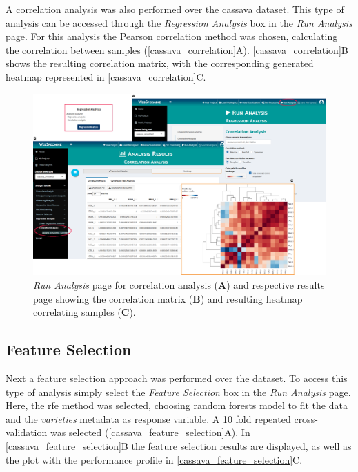 A correlation analysis was also performed over the cassava dataset. This type of analysis can be accessed through the \textit{Regression Analysis} box in the \textit{Run Analysis} page. For this analysis the Pearson correlation method was chosen, calculating the correlation between samples (\autoref{cassava_correlation}A). \autoref{cassava_correlation}B shows the resulting correlation matrix, with the corresponding generated heatmap represented in \autoref{cassava_correlation}C.


\begin{figure}[H]
	\centering
	\includegraphics[width=1\linewidth]{Imagens/CassavaPPD/correlation}
	\caption{\textit{Run Analysis} page for correlation analysis (\textbf{A}) and respective results page showing the correlation matrix (\textbf{B}) and resulting heatmap correlating samples (\textbf{C}).}
	\label{cassava_correlation}
\end{figure}


\subsection{Feature Selection}

Next a feature selection approach was performed over the dataset. To access this type of analysis simply select the \textit{Feature Selection} box in the \textit{Run Analysis} page. Here, the \gls{rfe} method was selected, choosing random forests model to fit the data and the \textit{varieties} metadata as response variable. A 10 fold repeated cross-validation was selected (\autoref{cassava_feature_selection}A). In \autoref{cassava_feature_selection}B the feature selection results are displayed, as well as the plot with the performance profile in \autoref{cassava_feature_selection}C. 


